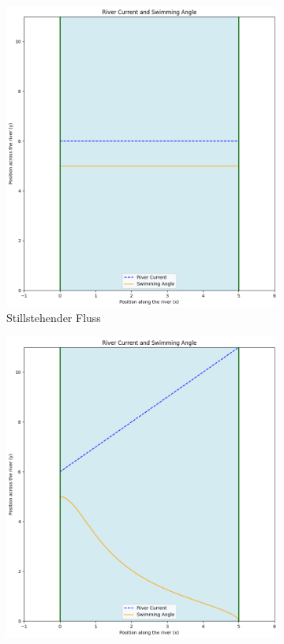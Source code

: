 \begin{figure}
    \centering
    \begin{subfigure}{0.48\textwidth}
        \centering
        \includegraphics[width=\textwidth]{papers/schwimmen/Grafiken/strait-crop.png}	
        \caption{Stillstehender Fluss \newline}
        \label{fig:no_velocity}
    \end{subfigure}
    \hfill  
    \begin{subfigure}{0.48\textwidth}
        \centering
        \includegraphics[width=\textwidth]{papers/schwimmen/Grafiken/diagoal-crop.png}	

\end{subfigure}
\end{figure}
